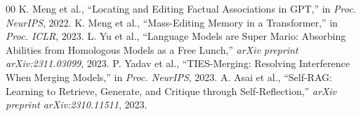\documentclass[10pt, conference, letterpaper]{IEEEtran}
\begin{document}
\begin{thebibliography}{00}
 K. Meng et al., ``Locating and Editing Factual Associations in GPT,'' in \textit{Proc. NeurIPS}, 2022.
 K. Meng et al., ``Mass-Editing Memory in a Transformer,'' in \textit{Proc. ICLR}, 2023.
 L. Yu et al., ``Language Models are Super Mario: Absorbing Abilities from Homologous Models as a Free Lunch,'' \textit{arXiv preprint arXiv:2311.03099}, 2023.
 P. Yadav et al., ``TIES-Merging: Resolving Interference When Merging Models,'' in \textit{Proc. NeurIPS}, 2023.
 A. Asai et al., ``Self-RAG: Learning to Retrieve, Generate, and Critique through Self-Reflection,'' \textit{arXiv preprint arXiv:2310.11511}, 2023.
\end{thebibliography}
\end{document}
